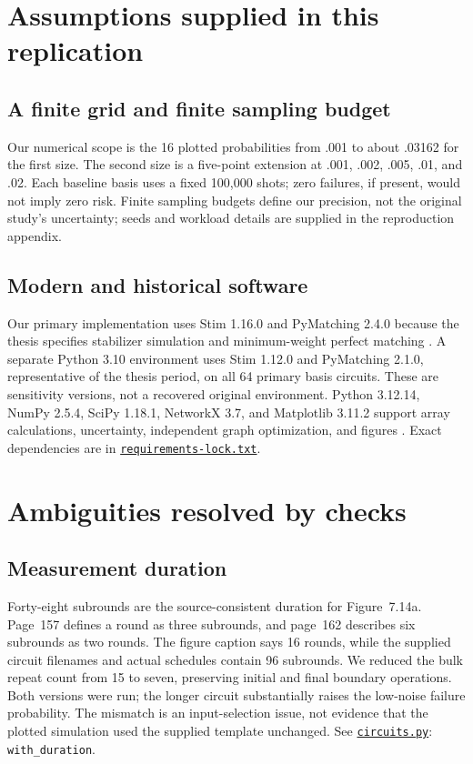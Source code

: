 \documentclass[11pt]{article}
\newcommand{\file}[2]{\href{https://github.com/alectionary/vibe-math/blob/master/formalization/higgott-quantum-decoding/#1}{\nolinkurl{#2}}}
\begin{document}
\section{Assumptions supplied in this replication}
\subsection{A finite grid and finite sampling budget}
Our numerical scope is the 16 plotted probabilities from .001 to about .03162 for the first size. The second size is a five-point extension at .001, .002, .005, .01, and .02. Each baseline basis uses a fixed 100,000 shots; zero failures, if present, would not imply zero risk. Finite sampling budgets define our precision, not the original study's uncertainty; seeds and workload details are supplied in the reproduction appendix.

\subsection{Modern and historical software}
Our primary implementation uses Stim 1.16.0 and PyMatching 2.4.0 because the thesis specifies stabilizer simulation and minimum-weight perfect matching \citep{stim,matching}. A separate Python 3.10 environment uses Stim 1.12.0 and PyMatching 2.1.0, representative of the thesis period, on all 64 primary basis circuits. These are sensitivity versions, not a recovered original environment. Python 3.12.14, NumPy 2.5.4, SciPy 1.18.1, NetworkX 3.7, and Matplotlib 3.11.2 support array calculations, uncertainty, independent graph optimization, and figures \citep{numpy,scipy,networkx,matplotlib,software}. Exact dependencies are in \file{provenance/requirements-lock.txt}{requirements-lock.txt}.

\section{Ambiguities resolved by checks}
\subsection{Measurement duration}
Forty-eight subrounds are the source-consistent duration for Figure~7.14a. Page~157 defines a round as three subrounds, and page~162 describes six subrounds as two rounds. The figure caption says 16 rounds, while the supplied circuit filenames and actual schedules contain 96 subrounds. We reduced the bulk repeat count from 15 to seven, preserving initial and final boundary operations. Both versions were run; the longer circuit substantially raises the low-noise failure probability. The mismatch is an input-selection issue, not evidence that the plotted simulation used the supplied template unchanged. See \file{circuits.py\#L6}{circuits.py}: \texttt{with\_duration}.
\end{document}
